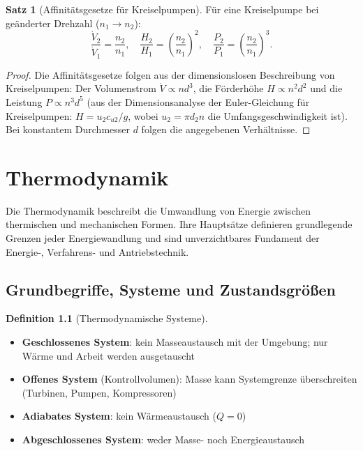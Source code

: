 ﻿\documentclass[a4paper,12pt]{report}
\theoremstyle{definition}
\newtheorem{definition}{Definition}
\newtheorem{satz}{Satz}
\begin{document}
\begin{satz}[Affinit\"atsgesetze f\"ur Kreiselpumpen]
F\"ur eine Kreiselpumpe bei ge\"anderter Drehzahl ($n_1 \to n_2$):
\[
  \frac{\dot{V}_2}{\dot{V}_1} = \frac{n_2}{n_1}, \quad
  \frac{H_2}{H_1} = \left(\frac{n_2}{n_1}\right)^2, \quad
  \frac{P_2}{P_1} = \left(\frac{n_2}{n_1}\right)^3.
\]
\end{satz}
\begin{proof}
Die Affinit\"atsgesetze folgen aus der dimensionslosen Beschreibung
von Kreiselpumpen: Der Volumenstrom $\dot{V} \propto n d^3$,
die F\"orderh\"ohe $H \propto n^2 d^2$ und die Leistung $P \propto n^3 d^5$
(aus der Dimensionsanalyse der Euler-Gleichung f\"ur Kreiselpumpen:
$H = u_2 c_{u2}/g$, wobei $u_2 = \pi d_2 n$ die Umfangsgeschwindigkeit ist).
Bei konstantem Durchmesser $d$ folgen die angegebenen Verh\"altnisse.
\end{proof}

\chapter{Thermodynamik}

Die Thermodynamik beschreibt die Umwandlung von Energie zwischen
thermischen und mechanischen Formen. Ihre Hauptsätze definieren
grundlegende Grenzen jeder Energiewandlung und sind unverzichtbares
Fundament der Energie-, Verfahrens- und Antriebstechnik.

\section{Grundbegriffe, Systeme und Zustandsgr\"o\ss{}en}

\begin{definition}[Thermodynamische Systeme]
\begin{itemize}
    \item[-] \textbf{Geschlossenes System}: kein Masseaustausch mit der Umgebung;
          nur W\"arme und Arbeit werden ausgetauscht
    \item[-] \textbf{Offenes System} (Kontrollvolumen): Masse kann Systemgrenze
          \"uberschreiten (Turbinen, Pumpen, Kompressoren)
    \item[-] \textbf{Adiabates System}: kein W\"armeaustausch ($Q = 0$)
    \item[-] \textbf{Abgeschlossenes System}: weder Masse- noch Energieaustausch
\end{itemize}
\end{definition}
\end{document}
